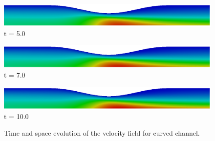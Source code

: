 \begin{figure}[H]
     \begin{minipage}{.50\linewidth}
      \centering
      \includegraphics[scale=0.175]{./02_chaps/cap_solution/figure/vel_Curved10000.png}\\
      t = 5.0
     \end{minipage}
     \begin{minipage}{.50\linewidth}
     \medskip
      \centering
      \includegraphics[scale=0.175]{./02_chaps/cap_solution/figure/vel_Curved14000.png}\\
      t = 7.0
     \end{minipage}%
     \begin{minipage}{.50\linewidth}
     \medskip
      \centering
      \includegraphics[scale=0.175]{./02_chaps/cap_solution/figure/vel_Curved20000.png}\\
      t = 10.0
     \end{minipage}
     \medskip
     \caption{Time and space evolution of the velocity field for curved channel.}
     \label{velocity field curved}
\end{figure}


